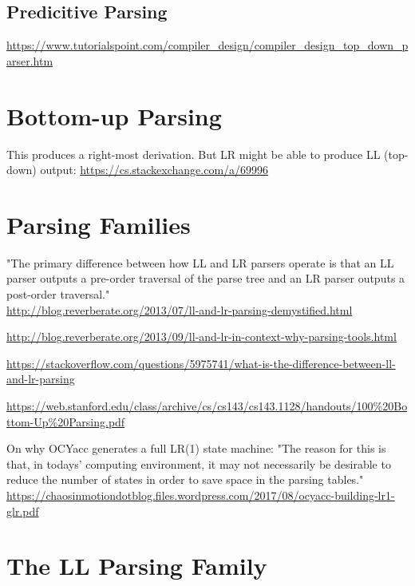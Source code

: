 \documentclass{book}
\begin{document}
\subsection{Predicitive Parsing}
\url{https://www.tutorialspoint.com/compiler_design/compiler_design_top_down_parser.htm}

\section{Bottom-up Parsing}
This produces a right-most derivation.
But LR might be able to produce LL (top-down) output: 
\url{https://cs.stackexchange.com/a/69996}

\section{Parsing Families}
"The primary difference between how LL and LR parsers operate is that an LL parser outputs a pre-order traversal of the parse tree and an LR parser outputs a post-order traversal."\\
\url{http://blog.reverberate.org/2013/07/ll-and-lr-parsing-demystified.html}

\vspace{10pt}

\url{http://blog.reverberate.org/2013/09/ll-and-lr-in-context-why-parsing-tools.html}

\vspace{10pt}

\url{https://stackoverflow.com/questions/5975741/what-is-the-difference-between-ll-and-lr-parsing}

\vspace{10pt}

\url{https://web.stanford.edu/class/archive/cs/cs143/cs143.1128/handouts/100%20Bottom-Up%20Parsing.pdf}

\vspace{10pt}

On why OCYacc generates a full LR(1) state machine:
"The reason for this is that, in todays' computing environment, it may not necessarily be desirable to reduce
the number of states in order to save space in the parsing tables."\\
\url{https://chaosinmotiondotblog.files.wordpress.com/2017/08/ocyacc-building-lr1-glr.pdf}


\section{The LL Parsing Family}
\end{document}
